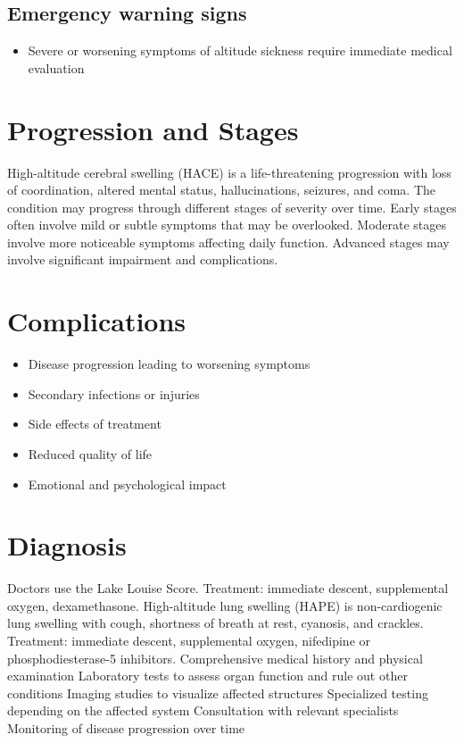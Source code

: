 \subsection{Emergency warning signs}
\begin{itemize}[noitemsep]
  \item Severe or worsening symptoms of altitude sickness require immediate medical evaluation
\end{itemize}
\section{Progression and Stages}
High-altitude cerebral swelling (HACE) is a life-threatening progression with loss of coordination, altered mental status, hallucinations, seizures, and coma. The condition may progress through different stages of severity over time. Early stages often involve mild or subtle symptoms that may be overlooked. Moderate stages involve more noticeable symptoms affecting daily function. Advanced stages may involve significant impairment and complications.
\section{Complications}
\begin{itemize}[noitemsep]
  \item Disease progression leading to worsening symptoms
  \item Secondary infections or injuries
  \item Side effects of treatment
  \item Reduced quality of life
  \item Emotional and psychological impact
\end{itemize}
\section{Diagnosis}
Doctors use the Lake Louise Score. Treatment: immediate descent, supplemental oxygen, dexamethasone. High-altitude lung swelling (HAPE) is non-cardiogenic lung swelling with cough, shortness of breath at rest, cyanosis, and crackles. Treatment: immediate descent, supplemental oxygen, nifedipine or phosphodiesterase-5 inhibitors. Comprehensive medical history and physical examination Laboratory tests to assess organ function and rule out other conditions Imaging studies to visualize affected structures Specialized testing depending on the affected system Consultation with relevant specialists Monitoring of disease progression over time

